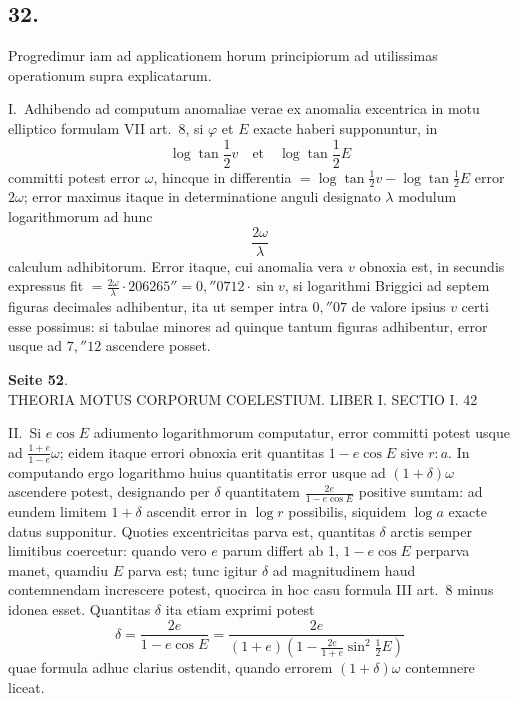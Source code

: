 \documentclass[12pt,a4paper]{article}
\begin{document}
\subsection*{32.}

Progredimur iam ad applicationem horum principiorum ad utilissimas operationum supra explicatarum.

I.~Adhibendo ad computum anomaliae verae ex anomalia excentrica in motu elliptico formulam VII art.~8, si $\varphi$ et $E$ exacte haberi supponuntur, in
\[
\log \tan \frac{1}{2}v \quad\text{et}\quad \log \tan \frac{1}{2}E
\]
committi potest error $\omega$, hincque in differentia $= \log \tan \frac{1}{2}v - \log \tan \frac{1}{2}E$ error $2\omega$; error maximus itaque in determinatione anguli designato $\lambda$ modulum logarithmorum ad hunc
\[
\frac{2\omega}{\lambda}
\]
calculum adhibitorum. Error itaque, cui anomalia vera $v$ obnoxia est, in secundis expressus fit $= \frac{2\omega}{\lambda} \cdot 206265'' = 0{,}''0712 \cdot \sin v$, si logarithmi Briggici ad septem figuras decimales adhibentur, ita ut semper intra $0{,}''07$ de valore ipsius $v$ certi esse possimus: si tabulae minores ad quinque tantum figuras adhibentur, error usque ad $7{,}''12$ ascendere posset.

\textbf{Seite 52}.\\
THEORIA MOTUS CORPORUM COELESTIUM. LIBER I. SECTIO I. 42

II.~Si $e \cos E$ adiumento logarithmorum computatur, error committi potest usque ad $\frac{1+e}{1-e}\omega$; eidem itaque errori obnoxia erit quantitas $1 - e \cos E$ sive $r : a$. In computando ergo logarithmo huius quantitatis error usque ad $(1 + \delta)\omega$ ascendere potest, designando per $\delta$ quantitatem $\frac{2e}{1-e \cos E}$ positive sumtam: ad eundem limitem $1 + \delta$ ascendit error in $\log r$ possibilis, siquidem $\log a$ exacte datus supponitur. Quoties excentricitas parva est, quantitas $\delta$ arctis semper limitibus coercetur: quando vero $e$ parum differt ab 1, $1 - e \cos E$ perparva manet, quamdiu $E$ parva est; tunc igitur $\delta$ ad magnitudinem haud contemnendam increscere potest, quocirca in hoc casu formula III art.~8 minus idonea esset. Quantitas $\delta$ ita etiam exprimi potest
\[
\delta = \frac{2e}{1 - e \cos E} = \frac{2e}{(1+e)(1 - \frac{2e}{1+e} \sin^2 \frac{1}{2}E)}
\]
quae formula adhuc clarius ostendit, quando errorem $(1+\delta)\omega$ contemnere liceat.
\end{document}
